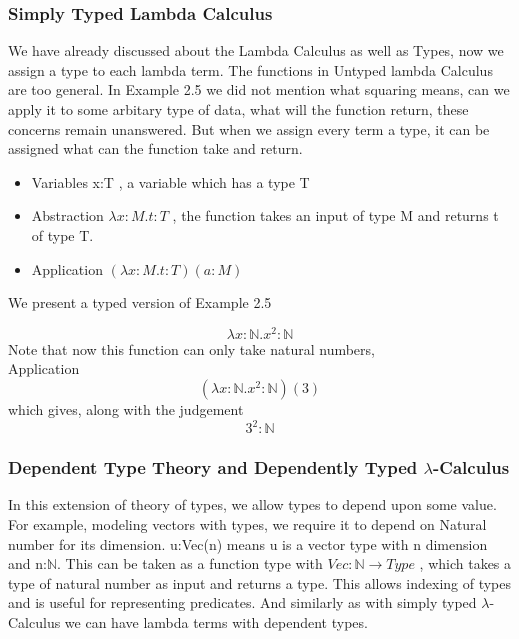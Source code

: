 \documentclass[12pt]{article}
\begin{document}
\subsubsection{Simply Typed Lambda Calculus}
 We have already discussed about the Lambda Calculus as well as Types, now we assign a type to each lambda term. The functions in Untyped lambda Calculus are too general. In Example 2.5 we did not mention what squaring means, can we apply it to some arbitary type of data, what will the function return, these concerns remain unanswered. But when we assign every term a type, it can be assigned what can the function take and return.
 \begin{itemize}
    \item Variables  x:T , a variable which has a type T
    \item Abstraction $\lambda x:M.t:T$ , the function takes an input of type M and returns t of type T.
    \item Application $(\lambda x:M.t:T)(a:M)$
    


 \end{itemize}
 
 We present a typed version of Example 2.5\\
 \begin{example}
    $$\lambda x:\mathbb{N}.x^2:\mathbb{N}$$
    Note that now this function can only take natural numbers,\\
    Application
    $$(\lambda x:\mathbb{N}.x^2:\mathbb{N})(3)$$
    which gives, along with the judgement
    $$3^2:\mathbb{N}$$
 \end{example}

\subsubsection{Dependent Type Theory and Dependently Typed $\lambda$-Calculus}
In this extension of theory of types, we allow types to depend upon some value. For example, modeling vectors with types, we require it to depend on Natural number for its dimension. 
u:Vec(n) means u is a vector type with n dimension and n:$\mathbb{N}$. 
This can be taken as a function type with $Vec:\mathbb{N} \to Type$ , which takes a type of natural number as input and returns a type. This allows indexing of types and is useful for representing predicates.
And similarly as with simply typed $\lambda$-Calculus we can have lambda terms with dependent types. 
\end{document}
